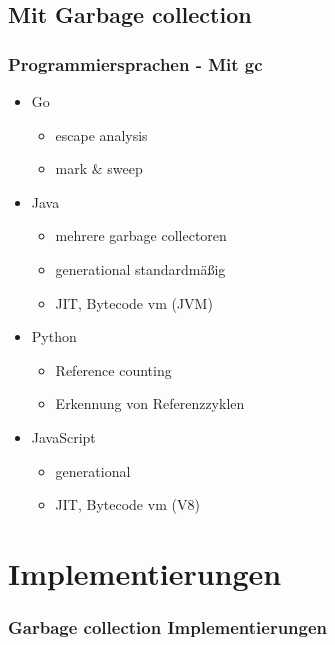 \documentclass{beamer}
\begin{document}
        \subsection{Mit Garbage collection}
            \begin{frame}
                \frametitle{Programmiersprachen - Mit gc}
                \begin{itemize}
                    \item Go
                    \begin{itemize}
                        \item escape analysis
                        \item mark \& sweep
                    \end{itemize}
                    \item Java
                    \begin{itemize}
                        \item mehrere garbage collectoren
                        \item generational standardmäßig
                        \item JIT, Bytecode vm (JVM)
                    \end{itemize}
                    \item Python
                    \begin{itemize}
                        \item Reference counting
                        \item Erkennung von Referenzzyklen
                    \end{itemize}
                    \item JavaScript
                    \begin{itemize}
                        \item generational
                        \item JIT, Bytecode vm (V8)
                    \end{itemize}
                \end{itemize}
            \end{frame}

    \section{Implementierungen}
        \begin{frame}
            \frametitle{Garbage collection Implementierungen}
        \end{frame}
\end{document}
